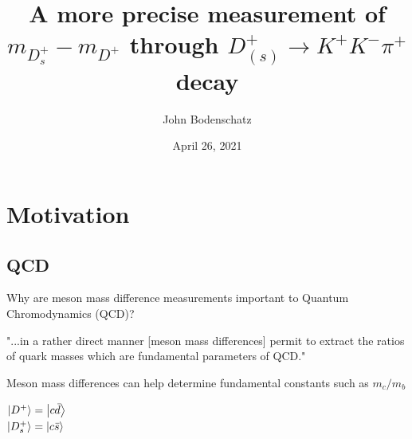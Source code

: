 \documentclass{beamer}%
\title[$M(D^+_s) - M(D^+)$]{A more precise measurement of $m_{D^+_s} - m_{D^+}$ through $D^{+}_{(s)} \rightarrow K^{+}K^{-}\pi^{+}$ decay}
\author[John Bodenschatz]{John Bodenschatz}
\institute{Physics Capstone\\ \vspace*{1.2em} Advisor: Dr. Michael Sokoloff}
\date{April 26, 2021}
\begin{document}






\section{Motivation}
  
  
\subsection{QCD}
  \begin{frame}
Why are meson mass difference measurements important to Quantum Chromodynamics (QCD)?
\vspace{1em}
\begin{block}{}
"...in a rather direct manner [meson mass differences] permit to extract the ratios of quark masses which are fundamental parameters of QCD.\cite{theory}"
\end{block}
\vspace{1em}
Meson mass differences can help determine fundamental constants such as $m_c/m_b$

{\large
\begin{center}
$\ket{D^+} = \ket{c\bar{d}}$ \\
$\ket{D^+_s} = \ket{c\bar{s}}$ 
\end{center}
}
  \end{frame}
  
  
  
\end{document}
